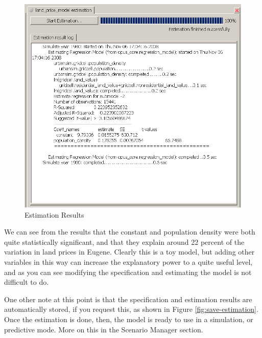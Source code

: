 \begin{figure}[htp]
\begin{center}
\includegraphics[scale=0.6]{part-gui/images/model-manager-specify-regression-model-4.png}
\end{center}
\caption{Estimation Results}
\label{fig:specify-regression-4}
\end{figure}

We can see from the results that the constant and population density were both quite statistically significant, and that they explain around 22 percent of the variation in land prices in Eugene.  Clearly this is a toy model, but adding other variables in this way can increase the explanatory power to a quite useful level, and as you can see modifying the specification and estimating the model is not difficult to do.

One other note at this point is that the specification and estimation results are automatically stored, if you request this, as shown in Figure  \ref{fig:save-estimation}.  Once the estimation is done, then, the model is ready to use in a simulation, or predictive mode.  More on this in the Scenario Manager section.

